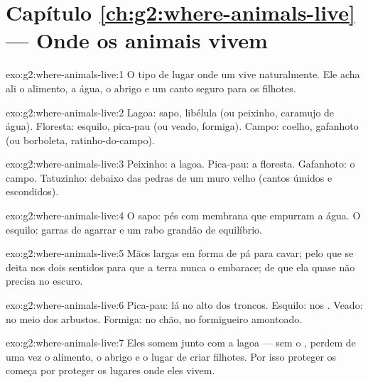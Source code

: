 \section*{Capítulo \ref{ch:g2:where-animals-live} --- Onde os animais vivem}

\begin{solution}{exo:g2:where-animals-live:1}
O tipo de lugar onde um  vive naturalmente. Ele acha ali o
alimento, a água, o abrigo e um canto seguro para os filhotes.
\end{solution}

\begin{solution}{exo:g2:where-animals-live:2}
Lagoa: sapo, libélula (ou peixinho, caramujo de água). Floresta:
esquilo, pica-pau (ou veado, formiga). Campo: coelho, gafanhoto (ou
borboleta, ratinho-do-campo).
\end{solution}

\begin{solution}{exo:g2:where-animals-live:3}
Peixinho: a lagoa. Pica-pau: a floresta. Gafanhoto: o campo.
Tatuzinho: debaixo das pedras de um muro velho (cantos úmidos e
escondidos).
\end{solution}

\begin{solution}{exo:g2:where-animals-live:4}
O sapo: pés com membrana que empurram a água. O esquilo: garras de
agarrar e um rabo grandão de equilíbrio.
\end{solution}

\begin{solution}{exo:g2:where-animals-live:5}
Mãos largas em forma de pá para cavar; pelo que se deita nos dois
sentidos para que a terra nunca o embarace;  de que ela quase
não precisa no escuro.
\end{solution}

\begin{solution}{exo:g2:where-animals-live:6}
Pica-pau: lá no alto dos troncos. Esquilo: nos . Veado: no
meio dos arbustos. Formiga: no chão, no formigueiro amontoado.
\end{solution}

\begin{solution}{exo:g2:where-animals-live:7}
Eles somem junto com a lagoa --- sem o , perdem de uma vez o
alimento, o abrigo e o lugar de criar filhotes. Por isso proteger os
 começa por proteger os lugares onde eles vivem.
\end{solution}


